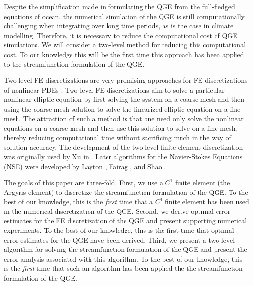 Despite the simplification made in formulating the QGE from the full-fledged
equations of ocean, the numerical simulation of the QGE is still computationally
challenging when integrating over long time periods, as is the case in climate
modelling. Therefore, it is necessary to reduce the computational cost of QGE
simulations. We will consider a two-level method for reducing this computational
cost. To our knowledge this will be the first time this approach has been applied
to the streamfunction formulation of the QGE.

Two-level FE discretizations are very promising approaches for FE
discretizations of nonlinear PDEs \cite{Fairag98,Layton93}. Two-level FE
discretizations aim to solve a particular nonlinear elliptic equation by
first solving the system on a coarse mesh and then using the coarse mesh
solution to solve the linearized elliptic equation on
a fine mesh. The attraction of such a method is that one need only solve the
nonlinear equations on a coarse mesh and then use this solution to solve on a
fine mesh, thereby reducing computational time without sacrificing much in the
way of solution accuracy. The development of the two-level finite element
discretization was originally used by Xu in \cite{Xu94}. Later algorithms for
the Navier-Stokes Equations (NSE) were developed by Layton \cite{Layton93},
Fairag \cite{Fairag98, Fairag03}, and Shao \cite{Shao11}.

The goals of this paper are three-fold. First, we use a $C^1$ finite element (the
Argyris element) to discretize the streamfunction formulation of the QGE. To the
best of our knowledge, this is the \emph{first} time that a $C^1$ finite element
has been used in the numerical discretization of the QGE. Second, we derive
optimal error estimates for the FE discretization of the QGE and present
supporting numerical experiments. To the best of our knowledge, this is the
first time that optimal error estimates for the QGE have been derived.  Third,
we present a two-level algorithm for solving the streamfunction formulation of
the QGE and present the error analysis associated with this algorithm. To the
best of our knowledge, this is the \emph{first} time that such an algorithm has
been applied the the streamfunction formulation of the QGE.
